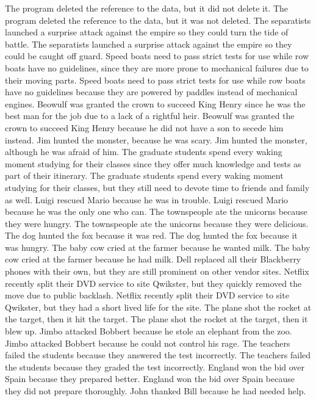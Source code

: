 \documentclass{article}
\begin{document}
\begin{enumerate}
	The program deleted the reference to the data, but it did not delete it.
	The program deleted the reference to the data, but it was not deleted.
	The separatists launched a surprise attack against the empire so they could turn the tide of battle.
	The separatists launched a surprise attack against the empire so they could be caught off guard.
	Speed boats need to pass strict tests for use while row boats have no guidelines, since they are more prone to mechanical failures due to their moving parts.
	Speed boats need to pass strict tests for use while row boats have no guidelines because they are powered by paddles instead of mechanical engines.
	Beowulf was granted the crown to succeed King Henry since he was the best man for the job due to a lack of a rightful heir.
	Beowulf was granted the crown to succeed King Henry because he did not have a son to secede him instead.
	Jim hunted the monster, because he was scary.
	Jim hunted the monster, although he was afraid of him.
	The graduate students spend every waking moment studying for their classes since they offer much knowledge and tests as part of their itinerary.
	The graduate students spend every waking moment studying for their classes, but they still need to devote time to friends and family as well.
	Luigi rescued Mario because he was in trouble.
	Luigi rescued Mario because he was the only one who can.
	The townspeople ate the unicorns because they were hungry.
	The townspeople ate the unicorns because they were delicious.
	The dog hunted the fox because it was red.
	The dog hunted the fox because it was hungry.
	The baby cow cried at the farmer because he wanted milk.
	The baby cow cried at the farmer because he had milk.
	Dell replaced all their Blackberry phones with their own, but they are still prominent on other vendor sites.
	Netflix recently split their DVD service to site Qwikster, but they quickly removed the move due to public backlash.
	Netflix recently split their DVD service to site Qwikster, but they had a short lived life for the site.
	The plane shot the rocket at the target, then it hit the target.
	The plane shot the rocket at the target, then it blew up.
	Jimbo attacked Bobbert because he stole an elephant from the zoo.
	Jimbo attacked Bobbert because he could not control his rage.
	The teachers failed the students because they answered the test incorrectly.
	The teachers failed the students because they graded the test incorrectly.
	England won the bid over Spain because they prepared better.
	England won the bid over Spain because they did not prepare thoroughly.
	John thanked Bill because he had needed help.

\end{enumerate}
\end{document}
